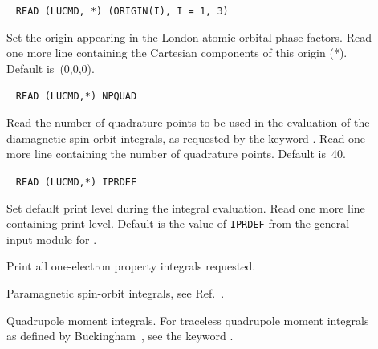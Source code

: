 \begin{description}
\item[]\verb| |\newline
\verb|READ (LUCMD, *) (ORIGIN(I), I = 1, 3)|

Set the origin appearing in the London atomic orbital phase-factors.
Read one more line containing the Cartesian components of this origin (*).
Default is~(0,0,0).

\item[]\verb| |\newline
\verb|READ (LUCMD,*) NPQUAD|

Read the number of quadrature points to be
used in the evaluation of
the diamagnetic spin-orbit integrals, as
requested by the keyword
. Read one more line containing the number of quadrature
points. Default is~40.

\item[]\verb| |\newline
\verb|READ (LUCMD,*) IPRDEF|

Set default print level during the integral evaluation.  Read one more line
containing print level. Default is the value of \verb|IPRDEF|
from the general input module for \siraba .

\item[] Print all one-electron property integrals requested.

\item[] Paramagnetic spin-orbit integrals, see
Ref.~\cite{ovhapjhjajsbpthjcp96}.


\item[] Quadrupole moment integrals. For traceless quadrupole moment integrals as
defined by Buckingham~\cite{adbacp12}, see the keyword .



\end{description}
